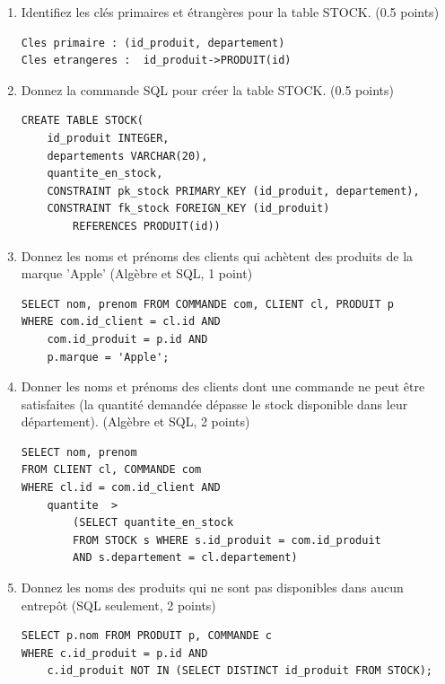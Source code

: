 \begin{enumerate}
\item Identifiez les cl\'es primaires et \'etrang\`eres pour la table STOCK. (0.5 points)
\begin{correction}
\begin{lstlisting}
Cles primaire : (id_produit, departement)
Cles etrangeres :  id_produit->PRODUIT(id)
\end{lstlisting}
\end{correction}

\item Donnez la commande SQL pour cr\'eer la table STOCK. (0.5 points)
\begin{correction}
\begin{lstlisting}
CREATE TABLE STOCK(
	id_produit INTEGER,
	departements VARCHAR(20),
	quantite_en_stock,
	CONSTRAINT pk_stock PRIMARY_KEY (id_produit, departement),
	CONSTRAINT fk_stock FOREIGN_KEY (id_produit)
		REFERENCES PRODUIT(id))
\end{lstlisting}
\end{correction}


\item Donnez les noms et pr\'enoms des clients qui ach\`etent des produits de la marque 'Apple'  (Alg\`ebre et SQL, 1 point)
\begin{correction}
\begin{lstlisting}
SELECT nom, prenom FROM COMMANDE com, CLIENT cl, PRODUIT p
WHERE com.id_client = cl.id AND
	com.id_produit = p.id AND
	p.marque = 'Apple';
\end{lstlisting}
\end{correction}

\item Donner les noms et pr\'enoms des clients dont une commande ne peut \^etre satisfaites (la quantit\'e demand\'ee d\'epasse le stock disponible dans leur d\'epartement). (Alg\`ebre et SQL, 2 points)
\begin{correction}
\begin{lstlisting}
SELECT nom, prenom 
FROM CLIENT cl, COMMANDE com
WHERE cl.id = com.id_client AND
	quantite  > 
		(SELECT quantite_en_stock  
		FROM STOCK s WHERE s.id_produit = com.id_produit 
		AND s.departement = cl.departement)
\end{lstlisting}
\end{correction}

\item Donnez les noms des produits qui ne sont pas disponibles dans aucun entrep\^ot (SQL seulement, 2 points)
\begin{correction}
\begin{lstlisting}
SELECT p.nom FROM PRODUIT p, COMMANDE c
WHERE c.id_produit = p.id AND 
	c.id_produit NOT IN (SELECT DISTINCT id_produit FROM STOCK);
\end{lstlisting}
\end{correction}


\end{enumerate}
